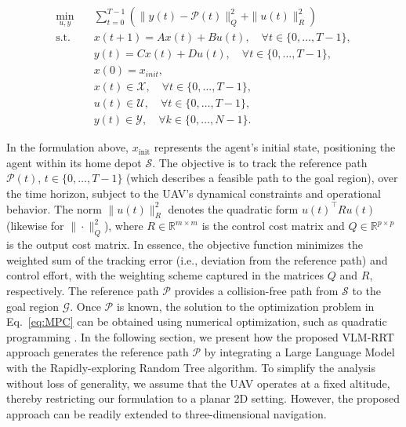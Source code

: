\vspace{-2mm}
\begin{equation}\label{eq:MPC}
\begin{aligned}
    \min_{u, y} \quad & \sum_{t=0}^{T-1} \left( \| y(t) - \mathcal{P}(t) \|_Q^2 + \| u(t) \|_R^2 \right) \\
    \text{s.t.} \quad & x(t+1) = A x(t) + B u(t), \quad \forall t \in \{0, \dots, T-1\}, \\
    & y(t) = C x(t) + D u(t), \quad \forall t \in \{0, \dots, T-1\}, \\
    & x(0) = x_{init}, \\
    & x(t) \in \mathcal{X}, \quad \forall t \in \{0, \dots, T-1\}, \\
    & u(t) \in \mathcal{U}, \quad \forall t \in \{0, \dots, T-1\}, \\
    & y(t) \in \mathcal{Y}, \quad \forall k \in \{0, \dots, N-1\}.
\end{aligned}
\end{equation}

\noindent In the formulation above, \( x_{\text{init}} \) represents the agent's initial state, positioning the agent within its home depot \( \mathcal{S} \). The objective is to track the reference path \( \mathcal{P}(t) \), \( t \in \{0, \ldots, T-1\} \) (which describes a feasible path to the goal region), over the time horizon, subject to the UAV's dynamical constraints and operational behavior. The norm \( \|u(t)\|^2_R \) denotes the quadratic form \( u(t)^\top R u(t) \) (likewise for \( \|\cdot\|^2_Q \)), where \( R \in \mathbb{R}^{m \times m} \) is the control cost matrix and \( Q \in \mathbb{R}^{p \times p} \) is the output cost matrix. In essence, the objective function minimizes the weighted sum of the tracking error (i.e., deviation from the reference path) and control effort, with the weighting scheme captured in the matrices \( Q \) and \( R \), respectively. The reference path \( \mathcal{P} \) provides a collision-free path from \( \mathcal{S} \) to the goal region \( \mathcal{G} \). Once \( \mathcal{P} \) is known, the solution to the optimization problem in Eq.~\eqref{eq:MPC} can be obtained using numerical optimization, such as quadratic programming \cite{nocedal2006quadratic}. In the following section, we present how the proposed VLM-RRT approach generates the reference path \( \mathcal{P} \) by integrating a Large Language Model with the Rapidly-exploring Random Tree algorithm. To simplify the analysis without loss of generality, we assume that the UAV operates at a fixed altitude, thereby restricting our formulation to a planar 2D setting. However, the proposed approach can be readily extended to three-dimensional navigation.


